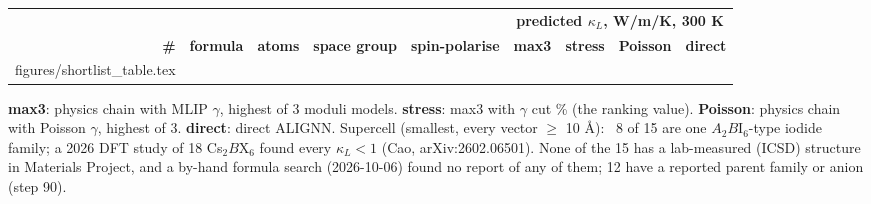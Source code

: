 \documentclass[aspectratio=169]{beamer}
\makeatletter
\newcommand{\TableRows}[1]{\@@input #1 }
\makeatother
\begin{document}
\begin{frame}
\end{frame}

\begin{frame}

\begin{center}
{\sffamily\fontsize{8.5}{10}\selectfont
\setlength{\tabcolsep}{3.2pt}
\renewcommand{\arraystretch}{0.88}
\begin{tabular}{@{}rlrlllrrr@{}}
\toprule
& & & & & \multicolumn{4}{c}{\textbf{predicted $\kappa_L$, W/m/K, 300 K}} \\
\cmidrule(l){6-9}
\textbf{\#} & \textbf{formula} & \textbf{atoms} & \textbf{space group} & \textbf{spin-polarise}
  & \textbf{max3} & \textbf{stress} & \textbf{Poisson} & \textbf{direct} \\
\midrule
\TableRows{figures/shortlist_table.tex}
\bottomrule
\end{tabular}}
\end{center}

\vspace{-2pt}
{\sffamily\tiny
\textbf{max3}: physics chain with MLIP $\gamma$, highest of 3 moduli models.
\textbf{stress}: max3 with $\gamma$ cut \AudStressPct\% (the ranking value).
\textbf{Poisson}: physics chain with Poisson $\gamma$, highest of 3.
\textbf{direct}: direct ALIGNN.
Supercell (smallest, every vector $\geq$ 10 \AA): \AudSupercellNote\ 
8 of 15 are one $A_2B$I$_6$-type iodide family; a 2026 DFT study of 18
Cs$_2B$X$_6$ found every $\kappa_L < 1$ (Cao, arXiv:2602.06501).
None of the 15 has a lab-measured (ICSD) structure in Materials Project, and a
by-hand formula search (2026-10-06) found no report of any of them; 12 have a
reported parent family or anion (step 90).\par}
\end{frame}
\end{document}
